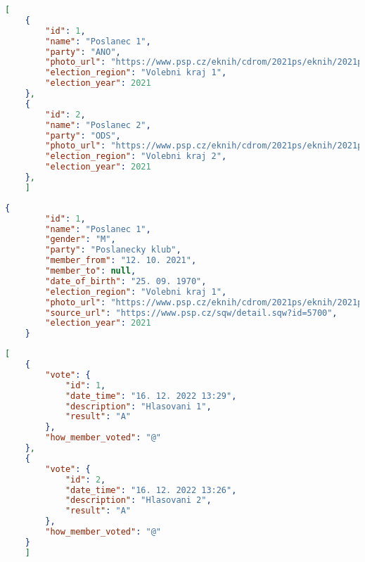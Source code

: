 \newpage

\begin{lstlisting}[caption={Tělo odpovědi pro dotaz \lstinline|GET /api/member|}, label={fig:member}, language=json,firstnumber=1,tabsize=2]
	[
	{
		"id": 1,
		"name": "Poslanec 1",
		"party": "ANO",
		"photo_url": "https://www.psp.cz/eknih/cdrom/2021ps/eknih/2021ps/poslanci/i6474.jpg",
		"election_region": "Volebni kraj 1",
		"election_year": 2021
	},
	{
		"id": 2,
		"name": "Poslanec 2",
		"party": "ODS",
		"photo_url": "https://www.psp.cz/eknih/cdrom/2021ps/eknih/2021ps/poslanci/i6804.jpg",
		"election_region": "Volebni kraj 2",
		"election_year": 2021
	},
	]
\end{lstlisting}

\begin{lstlisting}[caption={Tělo odpovědi pro dotaz \lstinline{GET /api/member/1}}, label={fig:member-1}, language=json,firstnumber=1,tabsize=2]
	{
		"id": 1,
		"name": "Poslanec 1",
		"gender": "M",
		"party": "Poslanecky klub",
		"member_from": "12. 10. 2021",
		"member_to": null,
		"date_of_birth": "25. 09. 1970",
		"election_region": "Volebni kraj 1",
		"photo_url": "https://www.psp.cz/eknih/cdrom/2021ps/eknih/2021ps/poslanci/i6474.jpg",
		"source_url": "https://www.psp.cz/sqw/detail.sqw?id=5700",
		"election_year": 2021
	}
\end{lstlisting}

\newpage

\begin{lstlisting}[caption={Tělo odpovědi pro dotaz \lstinline{GET /api/member/1/vote}}, label={fig:member-vote-1}, language=json,firstnumber=1,tabsize=2]
	[
	{
		"vote": {
			"id": 1,
			"date_time": "16. 12. 2022 13:29",
			"description": "Hlasovani 1",
			"result": "A"
		},
		"how_member_voted": "@"
	},
	{
		"vote": {
			"id": 2,
			"date_time": "16. 12. 2022 13:26",
			"description": "Hlasovani 2",
			"result": "A"
		},
		"how_member_voted": "@"
	}
	]
\end{lstlisting}